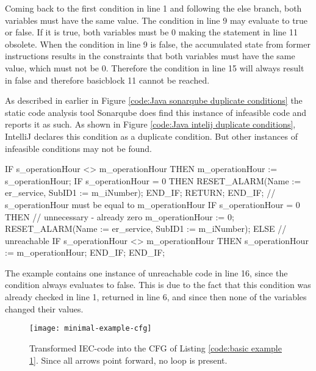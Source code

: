 Coming back to the first condition in line 1 and following the else branch, both variables must have the same value. The condition in line 9 may evaluate to true or false. If it is true, both variables must be 0 making the statement in line 11 obsolete. When the condition in line 9 is false, the accumulated state from former instructions results in the constraints that both variables must have the same value, which must not be 0. Therefore the condition in line 15 will always result in false and therefore basicblock 11 cannot be reached. 

As described in earlier in Figure \ref{code:Java sonarqube duplicate conditions} the static code analysis tool Sonarqube \cite{sonarqube} does find this instance of infeasible code and reports it as such. As shown in Figure \ref{code:Java intelij duplicate conditions}, IntelliJ \cite{IntelliJIDEACapable} declares this condition as a duplicate condition. But other instances of infeasible conditions may not be found. 




\begin{program}[h!]
	\begin{GenericCode}
IF s_operationHour <> m_operationHour THEN
	m_operationHour := s_operationHour;
	IF s_operationHour = 0 THEN
		RESET_ALARM(Name := er_service, SubID1 := m_iNumber);
	END_IF;
	RETURN;
END_IF;
// s_operationHour must be equal to m_operationHour
IF s_operationHour = 0 THEN
	// unnecessary - already zero
	m_operationHour := 0;
	RESET_ALARM(Name := er_service, SubID1 := m_iNumber);
ELSE
	// unreachable
	IF s_operationHour <> m_operationHour THEN
		s_operationHour := m_operationHour;
	END_IF;
END_IF;
	\end{GenericCode}
	\caption{The example contains one instance of unreachable code in line 16, since the condition always evaluates to false. This is due to the fact that this condition was already checked in line 1, returned in line 6, and since then none of the variables changed their values.}
	\label{code:basic example 1}
\end{program}

\begin{figure}[h!]
	\centering
	\texttt{[image: minimal-example-cfg]}
	\caption{Transformed IEC-code into the CFG of Listing \ref{code:basic example 1}. Since all arrows point forward, no loop is present.}
	\label{fig:basic example 1 cfg}
\end{figure}

